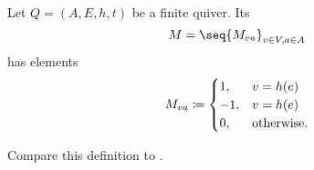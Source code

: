 \begin{definition}\label{def:quiver_incidence_matrix}
  Let \( Q = (A, E, h, t) \) be a finite quiver. Its 
  \begin{equation*}
    M = \seq{ M_{va} }_{v \in V, a \in A}
  \end{equation*}
  has elements
  \begin{equation*}
    M_{va} \coloneqq \begin{cases}
      1,  &v = h(e) \\
      -1, &v = h(e) \\
      0,  &\T{otherwise.}
    \end{cases}
  \end{equation*}

  Compare this definition to .
\end{definition}

